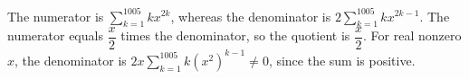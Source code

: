 The numerator is $\sum_{k=1}^{1005}kx^{2k}$, whereas the denominator is $2\sum_{k=1}^{1005}kx^{2k-1}$. The numerator equals $\dfrac{x}{2}$ times the denominator, so the quotient is $\boxed{\dfrac{x}{2}}$. For real nonzero $x$, the denominator is $2x\sum_{k=1}^{1005}k(x^2)^{k-1}\ne0$, since the sum is positive.
